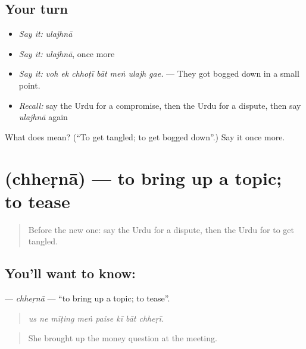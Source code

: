 \subsection*{Your turn}
\begin{itemize}
\raggedright
  \item \emph{Say it:} \emph{ulajhnā}
  \item \emph{Say it:} \emph{ulajhnā}, once more
  \item \emph{Say it:} \emph{voh ek chhoṭī bāt meṅ ulajh gae.} — They got bogged down in a small point.
  \item \emph{Recall:} say the Urdu for a compromise, then the Urdu for a dispute, then say \emph{ulajhnā} again
\end{itemize}

\begin{tcolorbox}[breakable,colback=teal!4,colframe=teal!35!black,title={Before you move on}]
What does  mean? (\textquotedblleft{}To get tangled; to get bogged down\textquotedblright{}.) Say it once more.
\end{tcolorbox}
\section[\texorpdfstring{\ur{چھیڑنا} (chheṛnā)}{چھیڑنا (chheṛnā)}]{ (chheṛnā) — to bring up a topic; to tease}

\label{lesson:UR-C347-chherna}



\begin{quote}
Before the new one: say the Urdu for a dispute, then the Urdu for to get tangled.
\end{quote}

\subsection*{You'll want to know: }
\textbf{} — \emph{chheṛnā} — \textquotedblleft{}to bring up a topic; to tease\textquotedblright{}.

\begin{quote}
       
\end{quote}

\begin{quote}
\emph{us ne mīṭing meṅ paise kī bāt chheṛī.}
\end{quote}

\begin{quote}
She brought up the money question at the meeting.
\end{quote}

